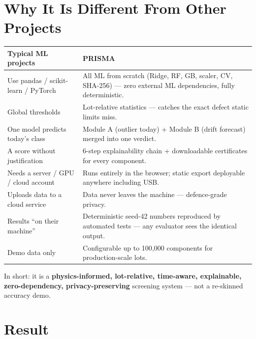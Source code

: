 \documentclass[11pt,a4paper]{article}
\newcommand{\answerbox}[2]{\par\vspace{0.8em}\noindent
  \begin{tcolorbox}[colback=isroblue!6,colframe=isroblue,
    title={\sffamily\bfseries\color{white}#1},arc=2pt,boxrule=1.2pt]
    #2
  \end{tcolorbox}\par\vspace{0.4em}}
\begin{document}
\section{Why It Is Different From Other Projects}

\answerbox{What makes PRISMA different from a typical ML classification demo}{
  \begin{center}
  \begin{tabular}{@{}p{6.3cm}p{8.3cm}@{}}
  \toprule
  \textbf{Typical ML projects} & \textbf{PRISMA}\\
  \midrule
  Use pandas / scikit-learn / PyTorch & All ML from scratch (Ridge, RF, GB, scaler, CV, SHA-256) ---
    zero external ML dependencies, fully deterministic.\\
  Global thresholds & Lot-relative statistics --- catches the exact defect static limits miss.\\
  One model predicts today's class & Module A (outlier today) + Module B (drift forecast) merged
    into one verdict.\\
  A score without justification & 6-step explainability chain + downloadable certificates for every
    component.\\
  Needs a server / GPU / cloud account & Runs entirely in the browser; static export deployable
    anywhere including USB.\\
  Uploads data to a cloud service & Data never leaves the machine --- defence-grade privacy.\\
  Results ``on their machine'' & Deterministic seed-42 numbers reproduced by automated tests ---
    any evaluator sees the identical output.\\
  Demo data only & Configurable up to 100{,}000 components for production-scale lots.\\
  \bottomrule
  \end{tabular}
  \end{center}
}

\noindent In short: it is a \textbf{physics-informed, lot-relative, time-aware, explainable,
zero-dependency, privacy-preserving} screening system --- not a re-skinned accuracy demo.

\section{Result}
\end{document}
